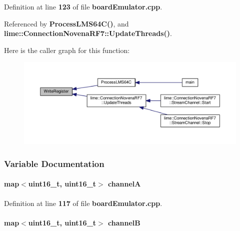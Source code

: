 Definition at line {\bf 123} of file {\bf board\+Emulator.\+cpp}.



Referenced by {\bf Process\+L\+M\+S64\+C()}, and {\bf lime\+::\+Connection\+Novena\+R\+F7\+::\+Update\+Threads()}.



Here is the caller graph for this function\+:
\nopagebreak
\begin{figure}[H]
\begin{center}
\leavevmode
\includegraphics[width=350pt]{df/df6/boardEmulator_8cpp_a5686580120a233bde133fc914a90c5fa_icgraph}
\end{center}
\end{figure}




\subsubsection{Variable Documentation}
\paragraph[{channelA}]{\setlength{\rightskip}{0pt plus 5cm}map$<$uint16\+\_\+t, uint16\+\_\+t$>$ channelA}\label{boardEmulator_8cpp_affcb26249fd3177bbd304bbe3a3880ec}


Definition at line {\bf 117} of file {\bf board\+Emulator.\+cpp}.

\paragraph[{channelB}]{\setlength{\rightskip}{0pt plus 5cm}map$<$uint16\+\_\+t, uint16\+\_\+t$>$ channelB}\label{boardEmulator_8cpp_af1bc8aac577c6c8f05c8d484e7c27fc8}


